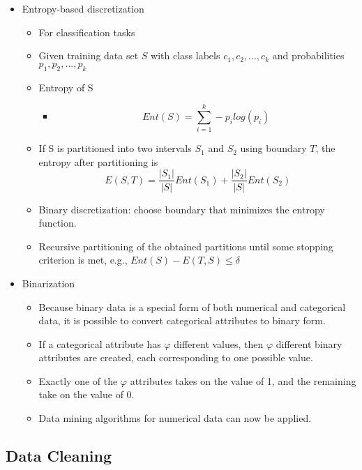 \documentclass[../notes.tex]{subfiles}
\begin{document}
\begin{itemize}
\begin{itemize}
    \item Entropy-based discretization
    \begin{itemize}
      \item For classification tasks
      \item Given training data set $S$ with class labels $c_1, c_2, ..., c_k$ and probabilities $p_1, p_2, ..., p_k$
      \item Entropy of S 
      \begin{itemize}
        \item $$Ent(S) = \sum_{i=1}^{k}-p_i log(p_i)$$
      \end{itemize} 
      \item If S is partitioned into two intervals $S_1$ and $S_2$ using boundary $T$, the entropy after partitioning is
      $$E(S, T) = \frac{|S_1|}{|S|}Ent(S_1) + \frac{|S_2|}{|S|}Ent(S_2)$$
      \item Binary discretization: choose boundary that minimizes the entropy function.
      \item Recursive partitioning of the obtained partitions until some stopping criterion is met, e.g., $Ent(S) - E(T, S) \le \delta$
    \end{itemize}

    \item Binarization
    \begin{itemize}
      \item Because binary data is a special form of both numerical and categorical data, it is possible to convert categorical attributes to binary form.
      \item If a categorical attribute has $\varphi$ different values, then $\varphi$  different binary attributes are created, each corresponding to one possible value.
      \item Exactly one of the $\varphi$ attributes takes on the value of 1, and the remaining take on the value of 0.
      \item Data mining algorithms for numerical data can now be applied.
    \end{itemize}    
  \end{itemize}
\end{itemize}

\subsection{Data Cleaning}
\end{document}
